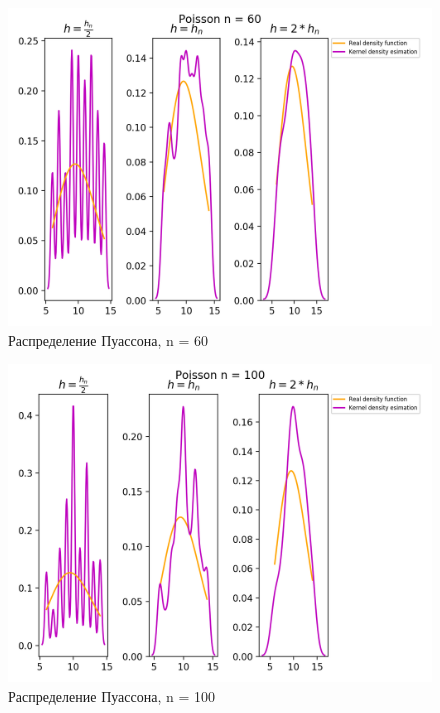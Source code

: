 \begin{figure}[H]
	\begin{center}
		\includegraphics[scale=0.7]{fig/Poisson60_kde.png}
		\caption{Распределение Пуассона, n = 60} 
		\label{pic:pic_name} 
	\end{center}
\end{figure}

\begin{figure}[H]
	\begin{center}
		\includegraphics[scale=0.7]{fig/Poisson100_kde.png}
		\caption{Распределение Пуассона, n = 100} 
		\label{pic:pic_name} 
	\end{center}
\end{figure}


